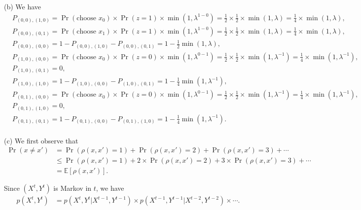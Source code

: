 \documentclass{article}
\begin{document}
\noindent
(b) We have
\begin{align*}
	&P_{(0, 0), (1, 0)} = \Pr(\text{choose $x_0$})\times\Pr(z = 1)\times\min(1, \lambda^{1-0}) = \frac{1}{2}\times\frac{1}{2}\times\min(1, \lambda) = \frac{1}{4}\times\min(1, \lambda),\\
	&P_{(0, 0), (0, 1)} = \Pr(\text{choose $x_1$})\times\Pr(z = 1)\times\min(1, \lambda^{1-0}) = \frac{1}{2}\times\frac{1}{2}\times\min(1, \lambda) = \frac{1}{4}\times\min(1, \lambda),
\\
	&P_{(0, 0), (0, 0)} = 1 - P_{(0, 0), (1, 0)} - P_{(0, 0), (0, 1)} = 1 - \frac{1}{2}\min(1, \lambda),\\
	&P_{(1, 0), (0, 0)} = \Pr(\text{choose $x_0$})\times\Pr(z = 0)\times\min(1, \lambda^{0-1}) = \frac{1}{2}\times\frac{1}{2}\times\min(1, \lambda^{-1}) = \frac{1}{4}\times\min(1, \lambda^{-1}),\\
	&P_{(1, 0), (0, 1)} = 0,
\\
	&P_{(1, 0), (1, 0)} = 1 - P_{(1, 0), (0, 0)} - P_{(1, 0), (0, 1)} = 1 - \frac{1}{4}\min(1, \lambda^{-1}),\\
		&P_{(0, 1), (0, 0)} = \Pr(\text{choose $x_0$})\times\Pr(z = 0)\times\min(1, \lambda^{0-1}) = \frac{1}{2}\times\frac{1}{2}\times\min(1, \lambda^{-1}) = \frac{1}{4}\times\min(1, \lambda^{-1}),\\
	&P_{(0, 1), (1, 0)} = 0,
\\
	&P_{(0, 1), (0, 1)} = 1 - P_{(0, 1), (0, 0)} - P_{(0, 1), (1, 0)} = 1 - \frac{1}{4}\min(1, \lambda^{-1}).
\end{align*}
\\

\noindent
(c) We first observe that
\begin{align*}
	\Pr(x \neq x') &= \Pr(\rho(x, x') = 1) + \Pr(\rho(x, x') = 2) + \Pr(\rho(x, x') = 3) + \cdots \\
	&\leq \Pr(\rho(x, x') = 1) + 2 \times \Pr(\rho(x, x') = 2) + 3 \times \Pr(\rho(x, x') = 3) + \cdots \\
	&= \mathbb{E}[\rho(x, x')].
\end{align*}
%

Since $(X^t, Y^t)$ is Markov in $t$, we have 
\begin{align*}
	p(X^t, Y^t) &= p(X^t, Y^t | X^{t-1}, Y^{t-1}) \times 
				  p(X^{t-1}, Y^{t-1} | X^{t-2}, Y^{t-2}) \times
				  \cdots.
\end{align*}
\end{document}
